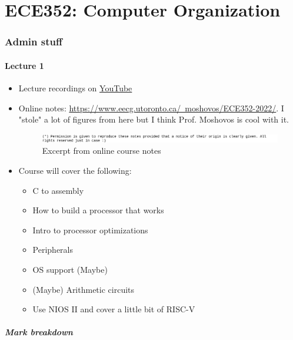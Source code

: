 \documentclass[../notes.tex]{subfiles}
\begin{document}
\part{ECE352: Computer Organization}

\section{Admin stuff}
\subsection{Lecture 1}





\begin{itemize}
	\item Lecture recordings on \href{https://tinyurl.com/2jthyk8k}{YouTube}
	\item Online notes: \href{https://www.eecg.utoronto.ca/~moshovos/ECE352-2022}{https://www.eecg.utoronto.ca/~moshovos/ECE352-2022/}. I "stole" a lot of figures from here but I think Prof. Moshovos is cool with it.
		\begin{figure}[H]
			\centering
			\includegraphics[width=0.8\linewidth]{img/image_2022-12-10-15-41-25.png}
			\caption{Excerpt from online course notes}
		\end{figure}
	\item Course will cover the following:
	 \begin{itemize}
	 	\item C to assembly
		\item How to build a processor that works
		\item Intro to processor optimizations
		\item Peripherals
		\item OS support (Maybe)
		\item (Maybe) Arithmetic circuits
		\item Use NIOS II and cover a little bit of RISC-V
	 \end{itemize}	
\end{itemize}



\subsubsection{Mark breakdown}
\end{document}
